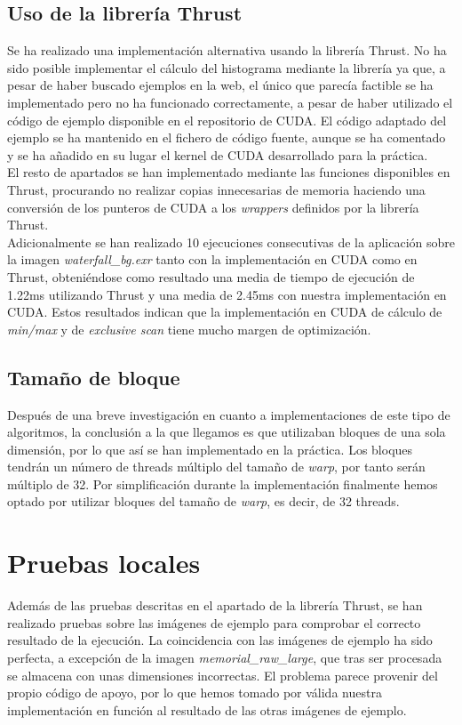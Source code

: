 \documentclass[10pt,oneside,a4paper]{article}
\begin{document}
\subsection{Uso de la librería Thrust}
Se ha realizado una implementación alternativa usando la librería Thrust. No ha sido posible implementar el cálculo del histograma mediante la librería ya que, a pesar de haber buscado ejemplos en la web, el único que parecía factible se ha implementado pero no ha funcionado correctamente, a pesar de haber utilizado el código de ejemplo disponible en el repositorio de CUDA. El código adaptado del ejemplo se ha mantenido en el fichero de código fuente, aunque se ha comentado y se ha añadido en su lugar el kernel de CUDA desarrollado para la práctica.\\

El resto de apartados se han implementado mediante las funciones disponibles en Thrust, procurando no realizar copias innecesarias de memoria haciendo una conversión de los punteros de CUDA a los \emph{wrappers} definidos por la librería Thrust.\\

Adicionalmente se han realizado 10 ejecuciones consecutivas de la aplicación sobre la imagen \textit{waterfall\_bg.exr} tanto con la implementación en CUDA como en Thrust, obteniéndose como resultado una media de tiempo de ejecución de 1.22ms utilizando Thrust y una media de 2.45ms con nuestra implementación en CUDA. Estos resultados indican que la implementación en CUDA de cálculo de \emph{min/max} y de \emph{exclusive scan} tiene mucho margen de optimización.

\subsection{Tamaño de bloque}
Después de una breve investigación en cuanto a implementaciones de este tipo de algoritmos, la conclusión a la que llegamos es que utilizaban bloques de una sola dimensión, por lo que así se han implementado en la práctica. Los bloques tendrán un número de threads múltiplo del tamaño de \textit{warp}, por tanto serán múltiplo de 32. Por simplificación durante la implementación finalmente hemos optado por utilizar bloques del tamaño de \emph{warp}, es decir, de 32 threads.

\section{Pruebas locales}
Además de las pruebas descritas en el apartado de la librería Thrust, se han realizado pruebas sobre las imágenes de ejemplo para comprobar el correcto resultado de la ejecución. La coincidencia con las imágenes de ejemplo ha sido perfecta, a excepción de la imagen \textit{memorial\_raw\_large}, que tras ser procesada se almacena con unas dimensiones incorrectas. El problema parece provenir del propio código de apoyo, por lo que hemos tomado por válida nuestra implementación en función al resultado de las otras imágenes de ejemplo.
\end{document}
